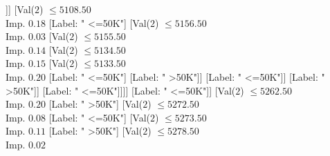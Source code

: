 \documentclass[margin=10pt]{standalone}
\begin{document}
\begin{forest}
																											[Val($2$) $ \leq 6109.50$ \\ Imp. $0.01$
																												[Val($2$) $ \leq 6043.50$ \\ Imp. $0.01$
																													[Val($2$) $ \leq 5328.50$ \\ Imp. $0.00$
																														[Val($2$) $ \leq 5240.50$ \\ Imp. $0.07$
																															[Val($2$) $ \leq 5194.50$ \\ Imp. $0.05$
																																[Val($2$) $ \leq 5045.50$ \\ Imp. $0.02$
																																	[Val($2$) $ \leq 5024.50$ \\ Imp. $0.10$
																																		[Label: " <=50K"]
																																		[Val($2$) $ \leq 5031.50$ \\ Imp. $0.29$
																																			[Label: " >50K"]
																																			[Label: " <=50K"]]]
																																	[Val($2$) $ \leq 5108.50$ \\ Imp. $0.18$
																																		[Label: " <=50K"]
																																		[Val($2$) $ \leq 5156.50$ \\ Imp. $0.03$
																																			[Val($2$) $ \leq 5155.50$ \\ Imp. $0.14$
																																				[Val($2$) $ \leq 5134.50$ \\ Imp. $0.15$
																																					[Val($2$) $ \leq 5133.50$ \\ Imp. $0.20$
																																						[Label: " <=50K"]
																																						[Label: " >50K"]]
																																					[Label: " <=50K"]]
																																				[Label: " >50K"]]
																																			[Label: " <=50K"]]]]
																																[Label: " <=50K"]]
																															[Val($2$) $ \leq 5262.50$ \\ Imp. $0.20$
																																[Label: " >50K"]
																																[Val($2$) $ \leq 5272.50$ \\ Imp. $0.08$
																																	[Label: " <=50K"]
																																	[Val($2$) $ \leq 5273.50$ \\ Imp. $0.11$
																																		[Label: " >50K"]
																																		[Val($2$) $ \leq 5278.50$ \\ Imp. $0.02$

\end{forest}
\end{document}
